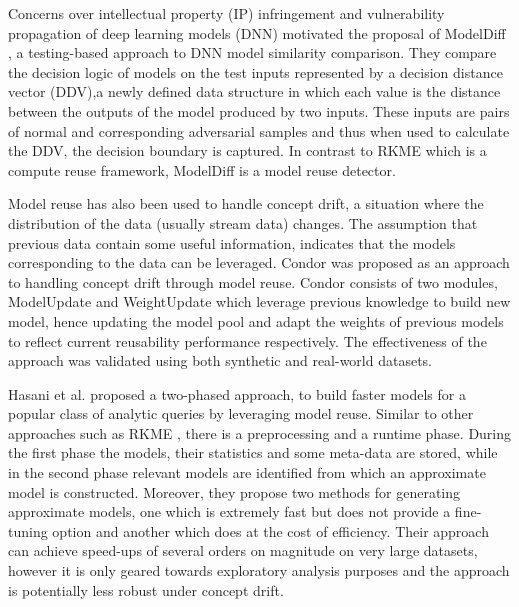 \documentclass{mprop}
\begin{document}
Concerns over intellectual property (IP) infringement and vulnerability propagation of deep learning models (DNN) motivated the proposal of ModelDiff \cite{DNNSimilarity}, a testing-based approach to DNN model similarity comparison. They compare the decision logic of models on the test inputs represented by a decision distance vector (DDV),a newly defined data structure in which each value is the distance between the outputs of the model produced by two inputs. These inputs are pairs of normal and corresponding adversarial samples and thus when used to calculate the DDV, the decision boundary is captured. In contrast to RKME \cite{KernelMMD} which is a compute reuse framework, ModelDiff is a model reuse detector. 

Model reuse has also been used to handle concept drift, a situation where the distribution of the data (usually stream data) changes. The assumption that previous data contain some useful information, indicates that the models corresponding to the data can be leveraged. Condor was proposed \cite{ConceptDrift} as an approach to handling concept drift through model reuse. Condor consists of two modules, ModelUpdate and WeightUpdate which leverage previous knowledge to build new model, hence updating the model pool and adapt the weights of previous models to reflect current reusability performance respectively. The effectiveness of the approach was validated using both synthetic and real-world datasets. 

Hasani et al. \cite{MaterializationReuse} proposed a two-phased approach, to build faster models for a popular class of analytic queries by leveraging model reuse. Similar to other approaches such as RKME \cite{KernelMMD}, there is a preprocessing and a runtime phase. During the first phase the models, their statistics and some meta-data are stored, while in the second phase relevant models are identified from which an approximate model is constructed. Moreover, they propose two methods for generating approximate models, one which is extremely fast but does not provide a fine-tuning option and another which does at the cost of efficiency. Their approach can achieve speed-ups of several orders on magnitude on very large datasets, however it is only geared towards exploratory analysis purposes and the approach is potentially less robust under concept drift. 
\end{document}
